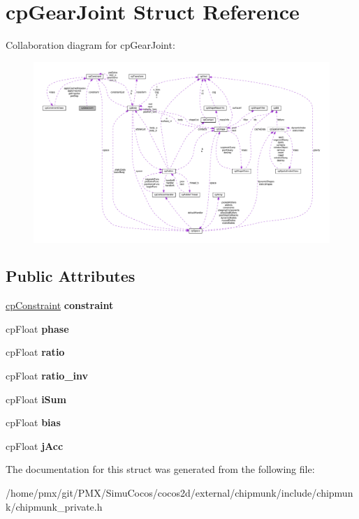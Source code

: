 \hypertarget{structcpGearJoint}{}\section{cp\+Gear\+Joint Struct Reference}
\label{structcpGearJoint}


Collaboration diagram for cp\+Gear\+Joint\+:
\nopagebreak
\begin{figure}[H]
\begin{center}
\leavevmode
\includegraphics[width=350pt]{structcpGearJoint__coll__graph}
\end{center}
\end{figure}
\subsection*{Public Attributes}
\begin{DoxyCompactItemize}
\item 
\mbox{\label{structcpGearJoint_acb21ac29bbf98409162715a54988564a}} 
\hyperlink{structcpConstraint}{cp\+Constraint} {\bfseries constraint}
\item 
\mbox{\label{structcpGearJoint_ae255b8761ec6a976ca56a119eaf7fda5}} 
cp\+Float {\bfseries phase}
\item 
\mbox{\label{structcpGearJoint_a7934797f6b15a2456a1b5dc95ff8f3f6}} 
cp\+Float {\bfseries ratio}
\item 
\mbox{\label{structcpGearJoint_a8ba9f80613eb37c26766e1cfd4fe2d29}} 
cp\+Float {\bfseries ratio\+\_\+inv}
\item 
\mbox{\label{structcpGearJoint_a2b2841e7f22baba0db78dc238d6b3520}} 
cp\+Float {\bfseries i\+Sum}
\item 
\mbox{\label{structcpGearJoint_a457177bdcb71ce3807df116a611bd36e}} 
cp\+Float {\bfseries bias}
\item 
\mbox{\label{structcpGearJoint_a3910d5240112327dd2a4f5ccc9170cf0}} 
cp\+Float {\bfseries j\+Acc}
\end{DoxyCompactItemize}


The documentation for this struct was generated from the following file\+:\begin{DoxyCompactItemize}
\item 
/home/pmx/git/\+P\+M\+X/\+Simu\+Cocos/cocos2d/external/chipmunk/include/chipmunk/chipmunk\+\_\+private.\+h\end{DoxyCompactItemize}
